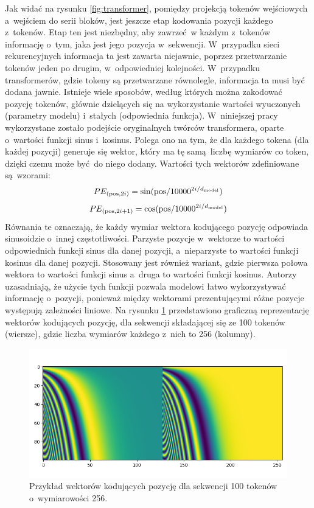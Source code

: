 Jak widać na rysunku \ref{fig:transformer}, pomiędzy projekcją tokenów wejściowych a~wejściem do serii bloków, jest jeszcze etap kodowania pozycji każdego z~tokenów. Etap ten jest niezbędny, aby zawrzeć w każdym z~tokenów informację o~tym, jaka jest jego pozycja w~sekwencji. W~przypadku sieci rekurencyjnych informacja ta jest zawarta niejawnie, poprzez przetwarzanie tokenów jeden po drugim, w~odpowiedniej kolejności. W~przypadku transformerów, gdzie tokeny są przetwarzane równolegle, informacja ta musi być dodana jawnie.  Istnieje wiele sposobów, według których można zakodować pozycję tokenów, głównie dzielących się na wykorzystanie wartości wyuczonych (parametry modelu) i~stałych (odpowiednia funkcja).  W~niniejszej pracy wykorzystane zostało podejście oryginalnych twórców transformera, oparte o~wartości funkcji sinus i~kosinus. Polega ono na tym, że dla każdego tokena (dla każdej pozycji) generuje się wektor, który ma tę samą liczbę wymiarów co token, dzięki czemu może być do niego dodany. Wartości tych wektorów zdefiniowane są wzorami:
\begin{equation}
    PE_{(\textrm{pos},2i)} = \sin(\textrm{pos}/10000^{2i/d_{\textrm{\tiny model}}})
\end{equation}
\begin{equation}
PE_{(\textrm{pos},2i + 1)} = \cos(\textrm{pos}/10000^{2i/d_{\textrm{\tiny model}}})
\end{equation}
Równania te oznaczają, że każdy wymiar wektora kodującego pozycję odpowiada sinusoidzie o~innej częstotliwości. Parzyste pozycje w~wektorze to wartości odpowiednich funkcji sinus dla danej pozycji, a~nieparzyste to wartości funkcji kosinus dla danej pozycji. Stosowany jest również wariant, gdzie pierwsza połowa wektora to wartości funkcji sinus a~druga to wartości funkcji kosinus. Autorzy uzasadniają, że użycie tych funkcji pozwala modelowi łatwo wykorzystywać informację o~pozycji, ponieważ między wektorami prezentującymi różne pozycje występują zależności liniowe. Na rysunku \ref{fig:positional_encoding} przedstawiono graficzną reprezentację wektorów kodujących pozycję, dla sekwencji składającej się ze 100 tokenów (wiersze), gdzie liczba wymiarów każdego z~nich to 256 (kolumny).
\begin{figure}
    \centering
    \includegraphics[width=1.0\textwidth]{./images/positional_encoding.png}
    \caption{Przykład wektorów kodujących pozycję dla sekwencji 100 tokenów o~wymiarowości 256.}
    \label{fig:positional_encoding}
\end{figure}

